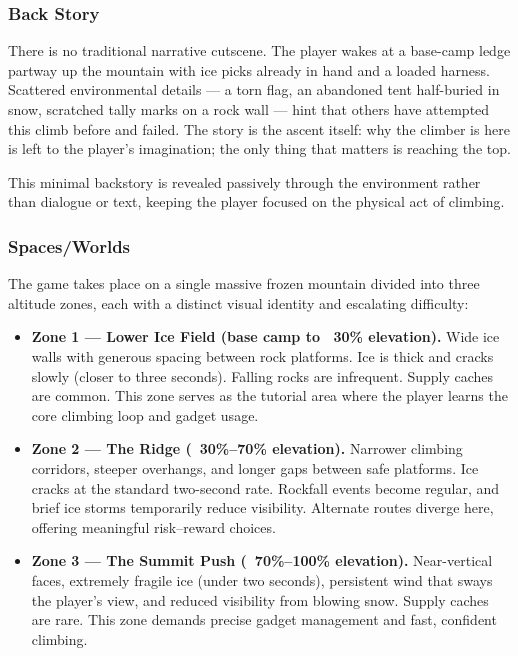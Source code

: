 \documentclass[12pt]{article}
\begin{document}
\subsubsection{Back Story}

There is no traditional narrative cutscene. The player wakes at a base-camp ledge partway up the mountain with ice picks already in hand and a loaded harness. Scattered environmental details --- a torn flag, an abandoned tent half-buried in snow, scratched tally marks on a rock wall --- hint that others have attempted this climb before and failed. The story is the ascent itself: why the climber is here is left to the player's imagination; the only thing that matters is reaching the top.

This minimal backstory is revealed passively through the environment rather than dialogue or text, keeping the player focused on the physical act of climbing.

\subsubsection{Spaces/Worlds}

The game takes place on a single massive frozen mountain divided into three altitude zones, each with a distinct visual identity and escalating difficulty:

\begin{itemize}[leftmargin=2em]
    \item \textbf{Zone 1 --- Lower Ice Field (base camp to ~30\% elevation).} Wide ice walls with generous spacing between rock platforms. Ice is thick and cracks slowly (closer to three seconds). Falling rocks are infrequent. Supply caches are common. This zone serves as the tutorial area where the player learns the core climbing loop and gadget usage.

    \item \textbf{Zone 2 --- The Ridge (~30\%--70\% elevation).} Narrower climbing corridors, steeper overhangs, and longer gaps between safe platforms. Ice cracks at the standard two-second rate. Rockfall events become regular, and brief ice storms temporarily reduce visibility. Alternate routes diverge here, offering meaningful risk--reward choices.

    \item \textbf{Zone 3 --- The Summit Push (~70\%--100\% elevation).} Near-vertical faces, extremely fragile ice (under two seconds), persistent wind that sways the player's view, and reduced visibility from blowing snow. Supply caches are rare. This zone demands precise gadget management and fast, confident climbing.
\end{itemize}
\end{document}
